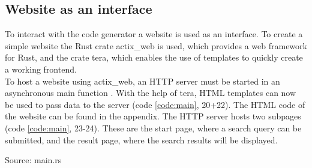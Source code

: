 \subsection{Website as an interface}
To interact with the code generator a website is used as an interface. To create a simple website the Rust crate actix\_web is used, which provides a web framework for Rust, and the crate tera, which enables the use of templates to quickly create a working frontend.\\
To host a website using actix\_web, an HTTP server must be started in an asynchronous main function \parencite[cf.][n.p.]{ede_actix_2022}. With the help of tera, HTML templates can now be used \parencite[cf.][n.p.]{prouillet_tera_2022} to pass data to the server (code \ref{code:main}, 20+22). The HTML code of the website can be found in the appendix. The HTTP server hosts two subpages (code \ref{code:main}, 23-24). These are the start page, where a search query can be submitted, and the result page, where the search results will be displayed.
\begin{codeenv}
    \label{code:main}
    
    \centerline{Source: main.rs}
\end{codeenv}